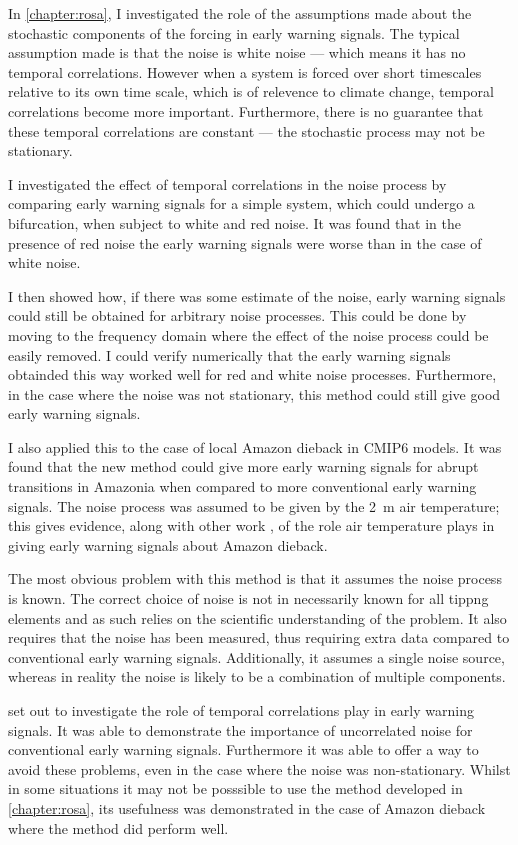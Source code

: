 In \cref{chapter:rosa}, I investigated the role of the assumptions made about the stochastic components of the forcing in early warning signals. The typical
assumption made is that the noise is white noise --- which means it has no temporal correlations. However when a system is forced over short timescales relative
to its own time scale, which is of relevence to climate change, temporal correlations become more important. Furthermore, there is no guarantee that these temporal
correlations are constant --- the stochastic process may not be stationary.

I investigated the effect of temporal correlations in the noise process by comparing early warning signals for a simple system, which could undergo a bifurcation, when subject to
white and red noise. It was found that in the presence of red noise the early warning signals were worse than in the case of white noise.

I then showed how, if there was some estimate of the noise, early warning signals could still be obtained for arbitrary noise processes. This could be done by moving to the frequency domain
where the effect of the noise process could be easily removed. I could verify numerically that the early warning signals obtainded this way worked well for red and white noise processes.
Furthermore, in the case where the noise was not stationary, this method could still give good early warning signals.

I also applied this to the case of local Amazon dieback in CMIP6 models. It was found that the new method could give more early warning signals for abrupt transitions in Amazonia
when compared to more conventional early warning signals. The noise process was assumed to be given by the \SI{2}{\meter} air temperature; this gives evidence, along with
other work \parencite{Parry2022,Ritchie2022}, of the role air temperature plays in giving early warning signals about Amazon dieback.

The most obvious problem with this method is that it assumes the noise process is known. The correct choice of noise is not in necessarily known for all
tippng elements and as such relies on the scientific understanding of the problem. It also requires that the noise has been measured, thus requiring extra data compared to
conventional early warning signals. Additionally, it assumes a single noise source, whereas in reality the noise is likely to be a combination of multiple components.

 set out to investigate the role of temporal correlations play in early warning signals. It was able to demonstrate the importance of uncorrelated noise
for conventional early warning signals. Furthermore it was able to offer a way to avoid these problems, even in the case where the noise was non-stationary.
Whilst in some situations it may not be posssible to use the method developed in \cref{chapter:rosa}, its usefulness was demonstrated in the case of Amazon dieback
where the method did perform well.


